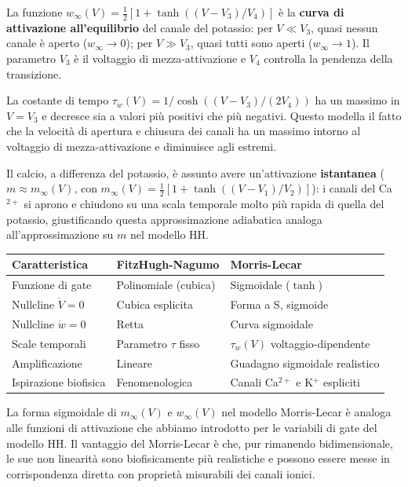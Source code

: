 La funzione $w_\infty(V) = \frac{1}{2}[1 + \tanh((V-V_3)/V_4)]$ è la \textbf{curva di attivazione all'equilibrio} del canale del potassio: per $V \ll V_3$, quasi nessun canale è aperto ($w_\infty \to 0$); per $V \gg V_3$, quasi tutti sono aperti ($w_\infty \to 1$). Il parametro $V_3$ è il voltaggio di mezza-attivazione e $V_4$ controlla la pendenza della transizione.

La costante di tempo $\tau_w(V) = 1/\cosh((V-V_3)/(2V_4))$ ha un massimo in $V = V_3$ e decresce sia a valori più positivi che più negativi. Questo modella il fatto che la velocità di apertura e chiusura dei canali ha un massimo intorno al voltaggio di mezza-attivazione e diminuisce agli estremi.

Il calcio, a differenza del potassio, è assunto avere un'attivazione \textbf{istantanea} ($m \approx m_\infty(V)$, con $m_\infty(V) = \frac{1}{2}[1 + \tanh((V-V_1)/V_2)]$): i canali del Ca$^{2+}$ si aprono e chiudono su una scala temporale molto più rapida di quella del potassio, giustificando questa approssimazione adiabatica analoga all'approssimazione su $m$ nel modello HH.


\begin{table}[htbp]
    \centering
    \renewcommand{\arraystretch}{1.3}
    \begin{tabularx}{\textwidth}{|>{\raggedright\arraybackslash}X|>{\raggedright\arraybackslash}X|>{\raggedright\arraybackslash}X|}
    \hline
    \textbf{Caratteristica} & \textbf{FitzHugh-Nagumo} & \textbf{Morris-Lecar} \\
    \hline
    Funzione di gate & Polinomiale (cubica) & Sigmoidale ($\tanh$) \\
    \hline
    Nullcline $\dot{V}=0$ & Cubica esplicita & Forma a S, sigmoide \\
    \hline
    Nullcline $\dot{w}=0$ & Retta & Curva sigmoidale \\
    \hline
    Scale temporali & Parametro $\tau$ fisso & $\tau_w(V)$ voltaggio-dipendente \\
    \hline
    Amplificazione & Lineare & Guadagno sigmoidale realistico \\
    \hline
    Ispirazione biofisica & Fenomenologica & Canali Ca$^{2+}$ e K$^+$ espliciti \\
    \hline
    \end{tabularx}
\end{table}

\begin{tcolorbox}[colback=gray!5, colframe=gray!40, arc=2mm, boxrule=0.5pt]
La forma sigmoidale di $m_\infty(V)$ e $w_\infty(V)$ nel modello Morris-Lecar è analoga alle funzioni di attivazione che abbiamo introdotto per le variabili di gate del modello HH. Il vantaggio del Morris-Lecar è che, pur rimanendo bidimensionale, le sue non linearità sono biofisicamente più realistiche e possono essere messe in corrispondenza diretta con proprietà misurabili dei canali ionici.
\end{tcolorbox}

